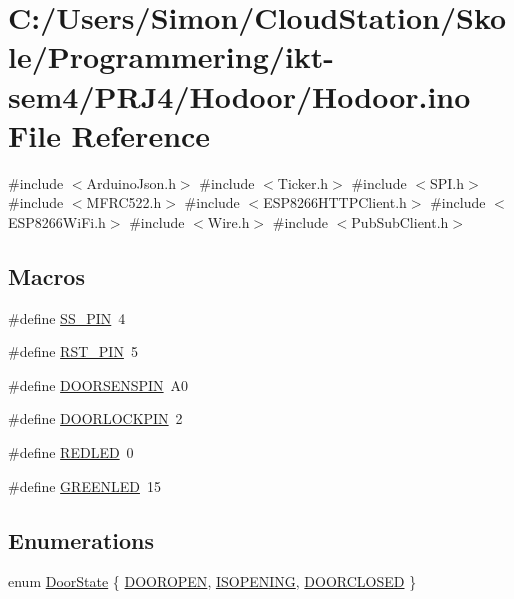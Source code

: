 \hypertarget{_hodoor_8ino}{}\section{C\+:/\+Users/\+Simon/\+Cloud\+Station/\+Skole/\+Programmering/ikt-\/sem4/\+P\+R\+J4/\+Hodoor/\+Hodoor.ino File Reference}
\label{_hodoor_8ino}
{\ttfamily \#include $<$Arduino\+Json.\+h$>$}\newline
{\ttfamily \#include $<$Ticker.\+h$>$}\newline
{\ttfamily \#include $<$S\+P\+I.\+h$>$}\newline
{\ttfamily \#include $<$M\+F\+R\+C522.\+h$>$}\newline
{\ttfamily \#include $<$E\+S\+P8266\+H\+T\+T\+P\+Client.\+h$>$}\newline
{\ttfamily \#include $<$E\+S\+P8266\+Wi\+Fi.\+h$>$}\newline
{\ttfamily \#include $<$Wire.\+h$>$}\newline
{\ttfamily \#include $<$Pub\+Sub\+Client.\+h$>$}\newline
\subsection*{Macros}
\begin{DoxyCompactItemize}
\item 
\#define \mbox{\hyperlink{_hodoor_8ino_a86fac98c9b4c98a3e50fc45440878391}{S\+S\+\_\+\+P\+IN}}~4
\item 
\#define \mbox{\hyperlink{_hodoor_8ino_a36932b0e869e0114f32e255f61306d6b}{R\+S\+T\+\_\+\+P\+IN}}~5
\item 
\#define \mbox{\hyperlink{_hodoor_8ino_a0041c43f3be2f6d289ddfa04b46a806a}{D\+O\+O\+R\+S\+E\+N\+S\+P\+IN}}~A0
\item 
\#define \mbox{\hyperlink{_hodoor_8ino_a9b753e79773b31559cb42a51930623f8}{D\+O\+O\+R\+L\+O\+C\+K\+P\+IN}}~2
\item 
\#define \mbox{\hyperlink{_hodoor_8ino_a1a93f984896e07e32aff39c2e0fb4459}{R\+E\+D\+L\+ED}}~0
\item 
\#define \mbox{\hyperlink{_hodoor_8ino_aef42a90443e2cce65762788edcbfb8ee}{G\+R\+E\+E\+N\+L\+ED}}~15
\end{DoxyCompactItemize}
\subsection*{Enumerations}
\begin{DoxyCompactItemize}
\item 
enum \mbox{\hyperlink{_hodoor_8ino_a117f8df7c03b73093e6da94ae41b4252}{Door\+State}} \{ \mbox{\hyperlink{_hodoor_8ino_a117f8df7c03b73093e6da94ae41b4252a18cd602003cbe103c9e4c31b1457bb36}{D\+O\+O\+R\+O\+P\+EN}}, 
\mbox{\hyperlink{_hodoor_8ino_a117f8df7c03b73093e6da94ae41b4252a602836d2bd713b6d76c70fcb4037a969}{I\+S\+O\+P\+E\+N\+I\+NG}}, 
\mbox{\hyperlink{_hodoor_8ino_a117f8df7c03b73093e6da94ae41b4252acc756382874a4e61574810dd02f00d4c}{D\+O\+O\+R\+C\+L\+O\+S\+ED}}
 \}
\end{DoxyCompactItemize}
